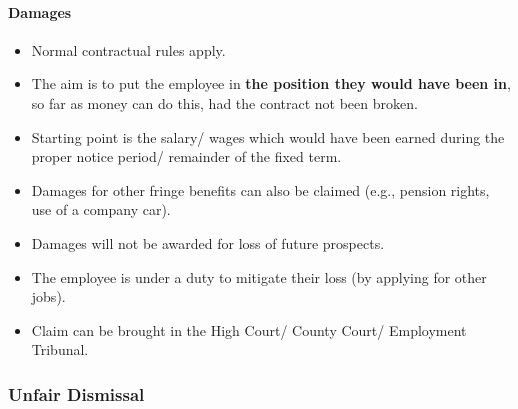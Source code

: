 \documentclass[
]{article}
\providecommand{\tightlist}{%
  \setlength{\itemsep}{0pt}\setlength{\parskip}{0pt}}
\begin{document}
\hypertarget{damages}{%
\paragraph{Damages}\label{damages}}

\begin{itemize}
\tightlist
\item
  Normal contractual rules apply.
\item
  The aim is to put the employee in \textbf{the position they would have
  been in}, so far as money can do this, had the contract not been
  broken.
\item
  Starting point is the salary/ wages which would have been earned
  during the proper notice period/ remainder of the fixed term.
\item
  Damages for other fringe benefits can also be claimed (e.g., pension
  rights, use of a company car).
\item
  Damages will not be awarded for loss of future prospects.
\item
  The employee is under a duty to mitigate their loss (by applying for
  other jobs).
\item
  Claim can be brought in the High Court/ County Court/ Employment
  Tribunal.
\end{itemize}

\hypertarget{unfair-dismissal}{%
\subsubsection{Unfair Dismissal}\label{unfair-dismissal}}
\end{document}
